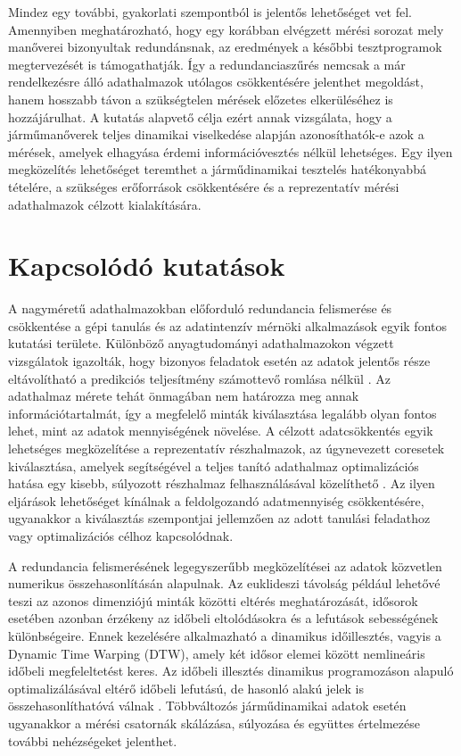 \documentclass[12pt,a4paper,onehalfspacing, oneside]{book} %
\begin{document}
Mindez egy további, gyakorlati szempontból is jelentős lehetőséget vet fel. Amennyiben meghatározható, hogy egy korábban elvégzett mérési sorozat mely manőverei bizonyultak redundánsnak, az eredmények a későbbi tesztprogramok megtervezését is támogathatják. Így a redundanciaszűrés nemcsak a már rendelkezésre álló adathalmazok utólagos csökkentésére jelenthet megoldást, hanem hosszabb távon a szükségtelen mérések előzetes elkerüléséhez is hozzájárulhat. A kutatás alapvető célja ezért annak vizsgálata, hogy a járműmanőverek teljes dinamikai viselkedése alapján azonosíthatók-e azok a mérések, amelyek elhagyása érdemi információvesztés nélkül lehetséges. Egy ilyen megközelítés lehetőséget teremthet a járműdinamikai tesztelés hatékonyabbá tételére, a szükséges erőforrások csökkentésére és a reprezentatív mérési adathalmazok célzott kialakítására.

\section{Kapcsolódó kutatások}
A nagyméretű adathalmazokban előforduló redundancia felismerése és csökkentése a gépi tanulás és az adatintenzív mérnöki alkalmazások egyik fontos kutatási területe. Különböző anyagtudományi adathalmazokon végzett vizsgálatok igazolták, hogy bizonyos feladatok esetén az adatok jelentős része eltávolítható a predikciós teljesítmény számottevő romlása nélkül \cite{li2023exploiting}. Az adathalmaz mérete tehát önmagában nem határozza meg annak információtartalmát, így a megfelelő minták kiválasztása legalább olyan fontos lehet, mint az adatok mennyiségének növelése. A célzott adatcsökkentés egyik lehetséges megközelítése a reprezentatív részhalmazok, az úgynevezett coresetek kiválasztása, amelyek segítségével a teljes tanító adathalmaz optimalizációs hatása egy kisebb, súlyozott részhalmaz felhasználásával közelíthető \cite{mirzasoleiman2020coresets}. Az ilyen eljárások lehetőséget kínálnak a feldolgozandó adatmennyiség csökkentésére, ugyanakkor a kiválasztás szempontjai jellemzően az adott tanulási feladathoz vagy optimalizációs célhoz kapcsolódnak.

A redundancia felismerésének legegyszerűbb megközelítései az adatok közvetlen numerikus összehasonlításán alapulnak. Az euklideszi távolság például lehetővé teszi az azonos dimenziójú minták közötti eltérés meghatározását, idősorok esetében azonban érzékeny az időbeli eltolódásokra és a lefutások sebességének különbségeire. Ennek kezelésére alkalmazható a dinamikus időillesztés, vagyis a Dynamic Time Warping (DTW), amely két idősor elemei között nemlineáris időbeli megfeleltetést keres. Az időbeli illesztés dinamikus programozáson alapuló optimalizálásával eltérő időbeli lefutású, de hasonló alakú jelek is összehasonlíthatóvá válnak \cite{sakoe1978dynamic}. Többváltozós járműdinamikai adatok esetén ugyanakkor a mérési csatornák skálázása, súlyozása és együttes értelmezése további nehézségeket jelenthet.
\end{document}
